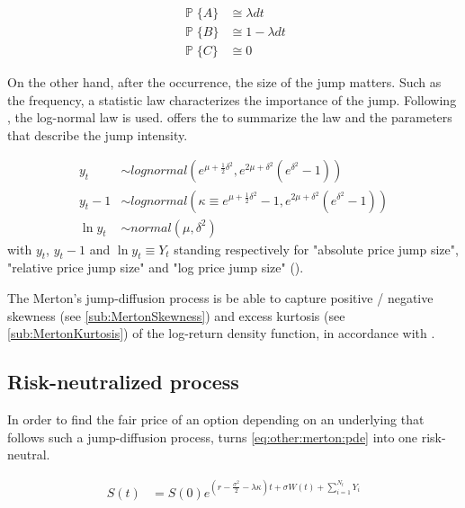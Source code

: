 \documentclass[12pt,a4paper]{report}
\newcommand{\Bm}{W\left(t\right)}
\newcommand{\St}{S\left(t\right)}
\begin{document}
\begin{align}
  \mathop{\mathbb{P}} \{A\}&\cong \lambda dt  \label{eq:PA}\\
  \mathop{\mathbb{P}} \{B\}&\cong 1 - \lambda dt  \label{eq:PB}\\
  \mathop{\mathbb{P}} \{C\}&\cong   0 \label{eq:PC}
\end{align}

On the other hand, after the occurrence, the size of the jump matters. Such as the frequency, a statistic law characterizes the importance of the jump. Following \citet{merton76}, the log-normal law is used. \citet{matsuda2004} offers the  to summarize the law and the parameters that describe the jump intensity.
 
\begin{align}
  y_t  &\sim lognormal( e^{\mu + \frac{1}{2} \delta^2}, 
                        e^{2 \mu + \delta ^2} (e^{\delta^2} - 1)) 
  \label{eq:yt} \\
  y_t - 1 &\sim lognormal( \kappa \equiv e^{\mu + \frac{1}{2} \delta^2} - 1, 
                        e^{2 \mu + \delta ^2} (e^{\delta^2} - 1)) 
  \label{eq:ytminus1} \\
  \ln{y_t} &\sim normal(\mu, \delta^ 2)
  \label{eq:lny}
\end{align}
with $y_t$, $y_t - 1$ and $\ln{y_t} \equiv Y_t$ standing respectively for "absolute price jump size", "relative price jump size" and "log price jump size" (\citet{matsuda2004}).

 
The Merton's jump-diffusion process is be able to capture positive / negative skewness (see \cref{sub:MertonSkewness}) and excess kurtosis (see \cref{sub:MertonKurtosis}) of the log-return density function, in accordance with \citet{merton76}. 


\subsection{Risk-neutralized process}
\label{sub:other:merton:risk}

In order to find the fair price of an option depending on an underlying that follows such a jump-diffusion process, \citet{merton76} turns \cref{eq:other:merton:pde} into one risk-neutral.

\begin{align}
  \St &= S\left(0\right) e^{\left(r - \frac{\sigma^2}{2} - \lambda \kappa\right) t + \sigma \Bm + \sum_{i=1}^{N_t} Y_i}
  \label{eq:other:merton:pde:riskneutral}
\end{align}
\end{document}
